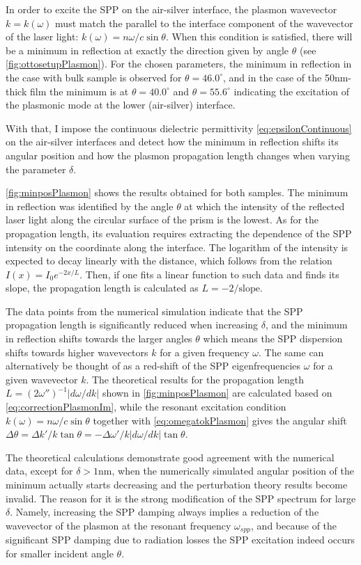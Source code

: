 In order to excite the SPP on the air-silver interface, the plasmon wavevector $k=k(\omega)$ must match the parallel to the interface component of the wavevector of the laser light: $k(\omega)=n\omega/c \sin\theta$.
When this condition is satisfied, there will be a minimum in reflection at exactly the direction given by angle $\theta$ (see \cref{fig:ottosetupPlasmon}).
%
For the chosen parameters, the minimum in reflection in the case with bulk sample is observed for $\theta=46.0^{\circ}$, and in the case of  the 50nm-thick film the minimum is at $\theta=40.0^{\circ}$ and $\theta=55.6^{\circ}$ indicating the excitation of the plasmonic mode at the lower (air-silver) interface.

With that, I impose the continuous dielectric permittivity \cref{eq:epsilonContinuous} on the air-silver interfaces and detect how the minimum in reflection shifts its angular position and how the plasmon propagation length changes when varying the parameter $\delta$.

\cref{fig:minposPlasmon} shows the results obtained for both samples.
The minimum in reflection was identified by the angle $\theta$ at which the intensity of the reflected laser light along the circular surface of the prism is the lowest.
As for the propagation length, its evaluation requires extracting the dependence of the SPP intensity on the coordinate along the interface.
The logarithm of the intensity is expected to decay linearly with the distance, which follows from the relation $I(x)=I_0 e^{-2x/L}$.
Then, if one fits a linear function to such data and finds its slope, the propagation length is calculated as $L=-2/\mathrm{slope}$.

The data points from the numerical simulation indicate that the SPP propagation length is significantly reduced when increasing $\delta$, and the minimum in reflection shifts towards the larger angles $\theta$ which means the SPP dispersion shifts towards higher wavevectors $k$ for a given frequency $\omega$.
The same can alternatively be thought of as a red-shift of the SPP eigenfrequencies $\omega$ for a given wavevector $k$.
The theoretical results for the propagation length $L=(2\omega'')^{-1} |d\omega/dk|$ shown in \cref{fig:minposPlasmon} are calculated based on \cref{eq:correctionPlasmonIm}, while the resonant excitation condition $k(\omega)=n\omega/c \sin\theta$ together with \cref{eq:omegatokPlasmon} gives the angular shift $\Delta\theta=\Delta k'/k \tan\theta=-\Delta\omega'/k |d\omega/dk|\tan\theta$.

The theoretical calculations demonstrate good agreement with the numerical data, except for $\delta>1$nm, when the numerically simulated angular position of the minimum actually starts decreasing and the perturbation theory results become invalid.
The reason for it is the strong modification of the SPP spectrum for large $\delta$.
Namely, increasing the SPP damping always implies a reduction of the wavevector of the plasmon at the resonant frequency $\omega_{spp}$, and because of the significant SPP damping due to radiation losses the SPP excitation indeed occurs for smaller incident angle $\theta$.

